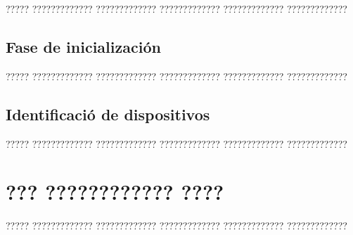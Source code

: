 \documentclass[11pt,spanish,listoffigures,listoftables]{tfgetsinf}
\begin{document}
????? ????????????? ????????????? ????????????? ????????????? ?????????????

\section{Fase de inicialización}

????? ????????????? ????????????? ????????????? ????????????? ?????????????

\section{Identificació de dispositivos}

????? ????????????? ????????????? ????????????? ????????????? ?????????????


\chapter{??? ???????????? ????}

????? ????????????? ????????????? ????????????? ????????????? ????????????? 

\end{document}
